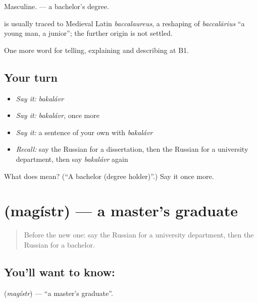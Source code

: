 Masculine. \emph{ } — a bachelor’s degree.

\begin{cousinweb}
\textbf{} is usually traced to Medieval Latin \emph{baccalaureus}, a reshaping of \emph{baccalārius} \textquotedblleft{}a young man, a junior\textquotedblright{}; the further origin is not settled.
\end{cousinweb}

\begin{grammarlens}[title={What you've built}]
One more word for telling, explaining and describing at B1.
\end{grammarlens}

\subsection*{Your turn}
\begin{itemize}
\raggedright
  \item \emph{Say it:} \emph{bakalávr}
  \item \emph{Say it:} \emph{bakalávr}, once more
  \item \emph{Say it:} a sentence of your own with \emph{bakalávr}
  \item \emph{Recall:} say the Russian for a dissertation, then the Russian for a university department, then say \emph{bakalávr} again
\end{itemize}

\begin{tcolorbox}[breakable,colback=teal!4,colframe=teal!35!black,title={Before you move on}]
What does  mean? (\textquotedblleft{}A bachelor (degree holder)\textquotedblright{}.) Say it once more.
\end{tcolorbox}
\section[\texorpdfstring{\ru{магистр} (magístr)}{магистр (magístr)}]{ (magístr) — a master’s graduate}

\label{lesson:RU-C385-magistr}



\begin{quote}
Before the new one: say the Russian for a university department, then the Russian for a bachelor.
\end{quote}

\subsection*{You'll want to know: }
\textbf{} (\emph{magístr}) — \textquotedblleft{}a master’s graduate\textquotedblright{}.

